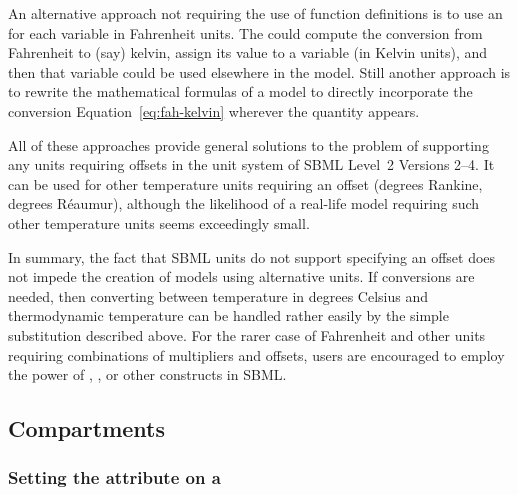\begin{itemize}
  An alternative approach not requiring the use of function
  definitions is to use an \AssignmentRule for each variable in
  Fahrenheit units.  The \AssignmentRule could compute the
  conversion from Fahrenheit to (say) kelvin, assign its value to
  a variable (in Kelvin units), and then that variable could be
  used elsewhere in the model.  Still another approach is to
  rewrite the mathematical formulas of a model to directly
  incorporate the conversion Equation~\ref{eq:fah-kelvin} wherever
  the quantity appears.

  All of these approaches provide general solutions to the problem
  of supporting any units requiring offsets in the unit system of
  SBML Level~2 Versions 2--4.  It can be used for other temperature units
  requiring an offset (\eg degrees Rankine, degrees R\'{e}aumur),
  although the likelihood of a real-life model requiring such
  other temperature units seems exceedingly small.

\end{itemize}

In summary, the fact that SBML units do not support specifying an offset 
does  not impede the creation of models using alternative units.  If
conversions are needed, then converting between temperature in
degrees Celsius and thermodynamic temperature can be handled
rather easily by the simple substitution described above.  For the
rarer case of Fahrenheit and other units requiring combinations of
multipliers and offsets, users are encouraged to employ the power
of \FunctionDefinition, \AssignmentRule, or other constructs in
SBML.



\subsection{Compartments}
\label{sec:bp:compartment}


\subsubsection{Setting the  attribute on a }
\label{sec:bp:size}


